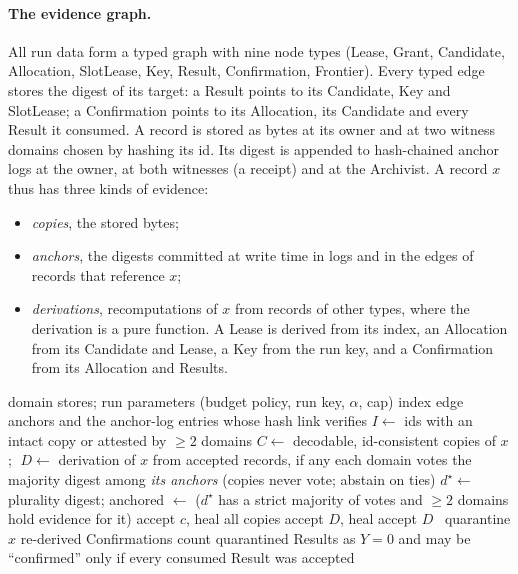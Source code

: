 \documentclass[11pt]{article}
\theoremstyle{definition}
\begin{document}
\paragraph{The evidence graph.} All run data form a typed graph with nine node types (Lease, Grant, Candidate, Allocation, SlotLease, Key, Result, Confirmation, Frontier). Every typed edge stores the digest of its target: a Result points to its Candidate, Key and SlotLease; a Confirmation points to its Allocation, its Candidate and every Result it consumed. A record is stored as bytes at its owner and at two witness domains chosen by hashing its id. Its digest is appended to hash-chained anchor logs at the owner, at both witnesses (a receipt) and at the Archivist. A record $x$ thus has three kinds of evidence:
\begin{itemize}
\item \emph{copies}, the stored bytes;
\item \emph{anchors}, the digests committed at write time in logs and in the edges of records that reference $x$;
\item \emph{derivations}, recomputations of $x$ from records of other types, where the derivation is a pure function. A Lease is derived from its index, an Allocation from its Candidate and Lease, a Key from the run key, and a Confirmation from its Allocation and Results.
\end{itemize}

\begin{algorithm}[!htbp]
\caption{TWGR (typed-witness graph repair).}\label{alg:twgr}
\begin{algorithmic}[1]
\Require domain stores; run parameters (budget policy, run key, $\alpha$, cap)
\State index edge anchors and the anchor-log entries whose hash link verifies
\State $I\gets$ ids with an intact copy or attested by $\ge 2$ domains 
  \State $C\gets$ decodable, id-consistent copies of $x$; $\;D\gets$ derivation of $x$ from accepted records, if any
  \State each domain votes the majority digest among \emph{its anchors} (copies never vote; abstain on ties)
  \State $d^\star\gets$ plurality digest; anchored $\gets$ ($d^\star$ has a strict majority of votes and $\ge 2$ domains hold evidence for it)
   accept $c$, heal all copies 
   accept $D$, heal 
   accept $D$ 
  \Else\ quarantine $x$
  \EndIf
 \EndFor
\EndFor
\State re-derived Confirmations count quarantined Results as $Y=0$ and may be ``confirmed'' only if every consumed Result was accepted
\end{algorithmic}
\end{algorithm}
\end{document}
